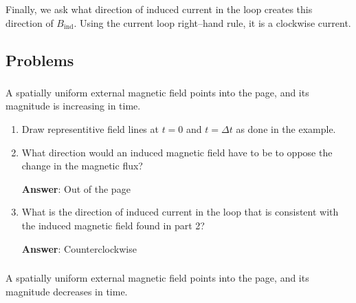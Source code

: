\documentclass{article}
\begin{document}
Finally, we ask what direction of induced current in the loop creates this direction of $B_{\text{ind}}$. Using the current loop right--hand rule, it is a clockwise current.



\newpage

\subsection{Problems}

\subsubsection{}

A spatially uniform external magnetic field points into the page, and its magnitude is increasing in time.



\begin{enumerate}

  \item Draw representitive field lines at $t=0$ and $t=\Delta t$ as done in the example.

        \ifsolutions

        \else

        
        \fi

  \item What direction would an induced magnetic field have to be to oppose the change in the magnetic flux?

        \ifsolutions
        {\bf Answer}: Out of the page
        \else

        \fi

  \item What is the direction of induced current in the loop that is consistent with the induced magnetic field found in part 2?

        \ifsolutions
        {\bf Answer}: Counterclockwise
        \else

        \newpage
        \fi

\end{enumerate}

\subsubsection{}

A spatially uniform external magnetic field points into the page, and its magnitude decreases in time.
\end{document}
